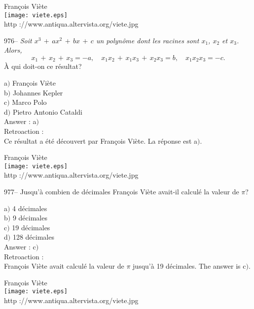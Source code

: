 ﻿\documentclass[letterpaper, 12pt]{article}
\begin{document}
        \begin{center}
        Fran\c cois Vi\`ete\\
    \texttt{[image: viete.eps]}\\
        {\footnotesize http ://www.antiqua.altervista.org/viete.jpg}
    \end{center}

976-- {\sl Soit $x^3\,+\,ax^2\,+\,bx\,+\,c$ un polyn\^ome dont les
racines sont $x_1$, $x_2$ et $x_3$. Alors,
$$x_1\,+\,x_2\,+\,x_3=-a,\quad x_1x_2\,+\,x_1x_3\,+\,x_2x_3=b,\quad
x_1x_2x_3=-c.$$}
\`A qui doit-on ce r\'esultat?

a$)$ Fran\c cois Vi\`ete \\
b$)$ Johannes Kepler  \\
c$)$ Marco Polo  \\
d$)$ Pietro Antonio Cataldi\\

Answer : a$)$\\

Retroaction : \\
Ce r\'esultat a \'et\'e d\'ecouvert par Fran\c cois Vi\`ete. La
r\'eponse est a$)$.

        \begin{center}
        Fran\c cois Vi\`ete\\
    \texttt{[image: viete.eps]}\\
        {\footnotesize http ://www.antiqua.altervista.org/viete.jpg}
    \end{center}

977-- Jusqu'\`a combien de d\'ecimales Fran\c cois Vi\`ete avait-il
calcul\'e la valeur de $\pi$?

a$)$ 4 d\'ecimales\\
b$)$ 9 d\'ecimales \\
c$)$ 19 d\'ecimales \\
d$)$ 128 d\'ecimales\\

Answer : c$)$\\

Retroaction : \\
Fran\c cois Vi\`ete avait calcul\'e la valeur de $\pi$ jusqu'\`a 19
d\'ecimales. The answer is c$)$.

        \begin{center}
        Fran\c cois Vi\`ete\\
    \texttt{[image: viete.eps]}\\
        {\footnotesize http ://www.antiqua.altervista.org/viete.jpg}
    \end{center}
\end{document}
